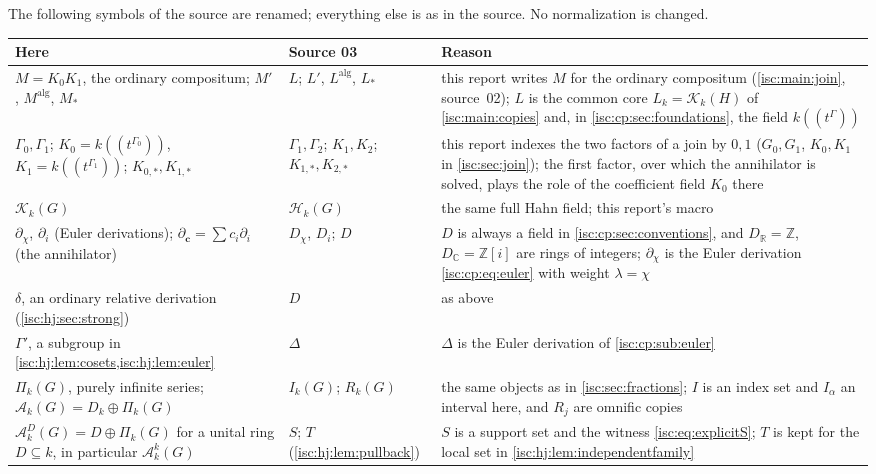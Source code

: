 \documentclass[11pt,letterpaper]{article}
\theoremstyle{definition}
\theoremstyle{remark}
\newcommand{\R}{\mathbb R}
\newcommand{\C}{\mathbb C}
\newcommand{\Z}{\mathbb Z}
\newcommand{\K}[2]{\mathcal K_{#1}(#2)}
\newcommand{\A}[2]{\mathcal A_{#1}(#2)}
\newcommand{\PiG}[2]{\Pi_{#1}(#2)}
\newcommand{\Ad}[3]{\mathcal A^{#1}_{#2}(#3)}%
\numberwithin{equation}{section}
\begin{document}
The following symbols of the source are renamed; everything else is as in
the source. No normalization is changed.
\begin{center}\small
\begin{longtable}{@{}>{\raggedright\arraybackslash}p{}>{\raggedright\arraybackslash}p{}>{\raggedright\arraybackslash}p{}@{}}
\toprule
Here & Source 03 & Reason\\
\midrule
\endhead
$M=K_0K_1$, the ordinary compositum; $M'$, $M^{\mathrm{alg}}$, $M_*$ & $L$;
$L'$, $L^{\mathrm{alg}}$, $L_*$ & this report writes $M$ for the ordinary
compositum (\cref{isc:main:join}, source~02); $L$ is the common core
$L_k=\K{k}{H}$ of \cref{isc:main:copies} and, in
\cref{isc:cp:sec:foundations}, the field $k((t^\Gamma))$\\
$\Gamma_0,\Gamma_1$; $K_0=k((t^{\Gamma_0}))$, $K_1=k((t^{\Gamma_1}))$;
$K_{0,*},K_{1,*}$ & $\Gamma_1,\Gamma_2$; $K_1,K_2$; $K_{1,*},K_{2,*}$ &
this report indexes the two factors of a join by $0,1$ ($G_0,G_1$,
$K_0,K_1$ in \cref{isc:sec:join}); the first factor, over which the
annihilator is solved, plays the role of the coefficient field $K_0$ there\\
$\K{k}{G}$ & $\mathcal H_k(G)$ & the same full Hahn field; this report's
macro\\
$\partial_\chi$, $\partial_i$ (Euler derivations);
$\partial_{\mathbf c}=\sum c_i\partial_i$ (the annihilator) & $D_\chi$,
$D_i$; $D$ & $D$ is always a field in \cref{isc:cp:sec:conventions}, and
$D_\R=\Z$, $D_\C=\Z[i]$ are rings of integers; $\partial_\chi$ is the
Euler derivation \eqref{isc:cp:eq:euler} with weight $\lambda=\chi$\\
$\delta$, an ordinary relative derivation (\cref{isc:hj:sec:strong}) & $D$
& as above\\
$\Gamma'$, a subgroup in \cref{isc:hj:lem:cosets,isc:hj:lem:euler} &
$\Delta$ & $\Delta$ is the Euler derivation of \cref{isc:cp:sub:euler}\\
$\PiG{k}{G}$, purely infinite series; $\A{k}{G}=D_k\oplus\PiG{k}{G}$ &
$I_k(G)$; $R_k(G)$ & the same objects as in \cref{isc:sec:fractions}; $I$
is an index set and $I_\alpha$ an interval here, and $R_j$ are omnific
copies\\
$\Ad{D}{k}{G}=D\oplus\PiG{k}{G}$ for a unital ring $D\subseteq k$, in
particular $\Ad{k}{k}{G}$ & $S$; $T$ (\cref{isc:hj:lem:pullback}) & $S$ is
a support set and the witness \eqref{isc:eq:explicitS}; $T$ is kept for
the local set in \cref{isc:hj:lem:independentfamily}\\

\end{longtable}
\end{center}
\end{document}
